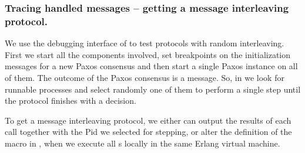 \subsubsection{Tracing handled messages -- getting a message  interleaving protocol.}

We use the debugging interface of  to test
protocols with random interleaving. First we start all the components
involved, set breakpoints on the initialization messages for a new Paxos
consensus and then start a single Paxos instance on all of them. The outcome
of the Paxos consensus is a  message. So, in
 we look for runnable processes
and select randomly one of them to perform a single step until the protocol
finishes with a decision.


To get a message interleaving protocol, we either can output the results
of each  call together with the
Pid we selected for stepping, or alter the definition of the macro
 in , when we execute all
s locally in the same Erlang virtual machine.





